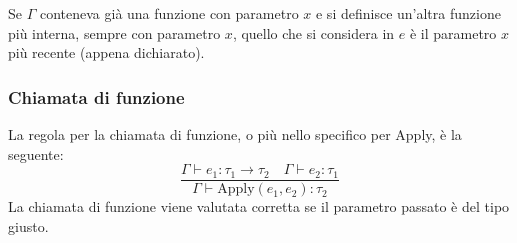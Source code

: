 Se $\Gamma$ conteneva già una funzione con parametro $x$ e si definisce un'altra funzione più interna, sempre con parametro
$x$, quello che si considera in $e$ è il parametro $x$ più recente (appena dichiarato).

\subsubsection{Chiamata di funzione}
La regola per la chiamata di funzione, o più nello specifico per Apply, è la seguente:
\[
	\frac{\Gamma \vdash e_1 : \tau_1 \rightarrow \tau_2 \quad \Gamma \vdash e_2 : \tau_1}
	{\Gamma \vdash \text{Apply} (e_1, e_2) : \tau_2}
\]
La chiamata di funzione viene valutata corretta se il parametro passato è del tipo giusto.
